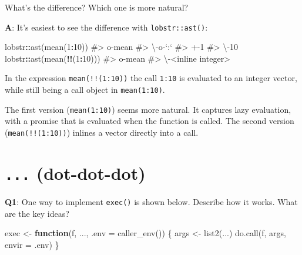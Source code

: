 \documentclass[
]{krantz}
\makeatletter
\newenvironment{Shaded}{\begin{snugshade}}{\end{snugshade}}
\newcommand{\CommentTok}[1]{\textcolor[rgb]{0.56,0.35,0.01}{\textit{#1}}}
\newcommand{\ControlFlowTok}[1]{\textcolor[rgb]{0.13,0.29,0.53}{\textbf{#1}}}
\newcommand{\DataTypeTok}[1]{\textcolor[rgb]{0.13,0.29,0.53}{#1}}
\newcommand{\DecValTok}[1]{\textcolor[rgb]{0.00,0.00,0.81}{#1}}
\newcommand{\KeywordTok}[1]{\textcolor[rgb]{0.13,0.29,0.53}{\textbf{#1}}}
\newcommand{\NormalTok}[1]{#1}
\newcommand{\OperatorTok}[1]{\textcolor[rgb]{0.81,0.36,0.00}{\textbf{#1}}}
\newcommand{\StringTok}[1]{\textcolor[rgb]{0.31,0.60,0.02}{#1}}
\newenvironment{kframe}{%
\medskip{}
\setlength{\fboxsep}{.8em}
 \def\at@end@of@kframe{}%
 \ifinner\ifhmode%
  \def\at@end@of@kframe{\end{minipage}}%
  \begin{minipage}{\columnwidth}%
 \fi\fi%
 \def\FrameCommand##1{\hskip\@totalleftmargin \hskip-\fboxsep
 \colorbox{shadecolor}{##1}\hskip-\fboxsep
     \hskip-\linewidth \hskip-\@totalleftmargin \hskip\columnwidth}%
 \MakeFramed {\advance\hsize-\width
   \@totalleftmargin\z@ \linewidth\hsize
   \@setminipage}}%
 {\par\unskip\endMakeFramed%
 \at@end@of@kframe}
\renewenvironment{Shaded}{\begin{kframe}}{\end{kframe}}
\renewcommand{\KeywordTok} [1]{\textcolor[rgb]{0.00,0.44,0.13}{{#1}}}
\renewcommand{\DataTypeTok}[1]{\textcolor[rgb]{0.56,0.13,0.00}{{#1}}}
\renewcommand{\DecValTok}  [1]{\textcolor[rgb]{0.25,0.63,0.44}{{#1}}}
\renewcommand{\StringTok}  [1]{\textcolor[rgb]{0.25,0.44,0.63}{{#1}}}
\renewcommand{\CommentTok} [1]{\textcolor[rgb]{0.38,0.63,0.69}{{#1}}}
\renewcommand{\NormalTok}  [1]{{#1}}
\makeatother
\begin{document}
What's the difference? Which one is more natural?

\textbf{{A}}: It's easiest to see the difference with \texttt{lobstr::ast()}:

\begin{Shaded}
\begin{Highlighting}[]
\NormalTok{lobstr}\OperatorTok{::}\KeywordTok{ast}\NormalTok{(}\KeywordTok{mean}\NormalTok{(}\DecValTok{1}\OperatorTok{:}\DecValTok{10}\NormalTok{))}
\CommentTok{#> o-mean }
\CommentTok{#> \textbackslash{}-o-`:` }
\CommentTok{#>   +-1 }
\CommentTok{#>   \textbackslash{}-10}
\NormalTok{lobstr}\OperatorTok{::}\KeywordTok{ast}\NormalTok{(}\KeywordTok{mean}\NormalTok{(}\OperatorTok{!!}\NormalTok{(}\DecValTok{1}\OperatorTok{:}\DecValTok{10}\NormalTok{)))}
\CommentTok{#> o-mean }
\CommentTok{#> \textbackslash{}-<inline integer>}
\end{Highlighting}
\end{Shaded}

In the expression \texttt{mean(!!(1:10))} the call \texttt{1:10} is evaluated to an integer vector, while still being a call object in \texttt{mean(1:10)}.

The first version (\texttt{mean(1:10)}) seems more natural. It captures lazy evaluation, with a promise that is evaluated when the function is called. The second version (\texttt{mean(!!(1:10))}) inlines a vector directly into a call.


\hypertarget{dot-dot-dot-1}{%
\section{\texorpdfstring{\texttt{...} (dot-dot-dot)}{... (dot-dot-dot)}}\label{dot-dot-dot-1}}

\textbf{{Q1}}: One way to implement \texttt{exec()} is shown below. Describe how it works. What are the key ideas?

\begin{Shaded}
\begin{Highlighting}[]
\NormalTok{exec <-}\StringTok{ }\ControlFlowTok{function}\NormalTok{(f, ..., }\DataTypeTok{.env =} \KeywordTok{caller_env}\NormalTok{()) \{}
\NormalTok{  args <-}\StringTok{ }\KeywordTok{list2}\NormalTok{(...)}
  \KeywordTok{do.call}\NormalTok{(f, args, }\DataTypeTok{envir =}\NormalTok{ .env)}
\NormalTok{\}}
\end{Highlighting}
\end{Shaded}
\end{document}
